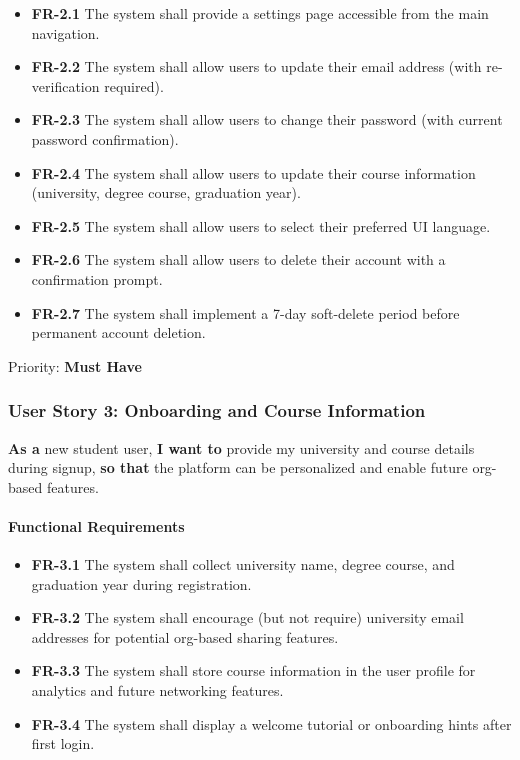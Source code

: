\documentclass[12pt,a4paper]{article}
\begin{document}
\begin{itemize}
    \item \textbf{FR-2.1} The system shall provide a settings page accessible from the main navigation.
    \item \textbf{FR-2.2} The system shall allow users to update their email address (with re-verification required).
    \item \textbf{FR-2.3} The system shall allow users to change their password (with current password confirmation).
    \item \textbf{FR-2.4} The system shall allow users to update their course information (university, degree course, graduation year).
    \item \textbf{FR-2.5} The system shall allow users to select their preferred UI language.
    \item \textbf{FR-2.6} The system shall allow users to delete their account with a confirmation prompt.
    \item \textbf{FR-2.7} The system shall implement a 7-day soft-delete period before permanent account deletion.
\end{itemize}

Priority: \textbf{Must Have}

\subsubsection{User Story 3: Onboarding and Course Information}

\textbf{As a} new student user, \textbf{I want to} provide my university and course details during signup, \textbf{so that} the platform can be personalized and enable future org-based features.

\paragraph{Functional Requirements}

\begin{itemize}
    \item \textbf{FR-3.1} The system shall collect university name, degree course, and graduation year during registration.
    \item \textbf{FR-3.2} The system shall encourage (but not require) university email addresses for potential org-based sharing features.
    \item \textbf{FR-3.3} The system shall store course information in the user profile for analytics and future networking features.
    \item \textbf{FR-3.4} The system shall display a welcome tutorial or onboarding hints after first login.
\end{itemize}
\end{document}
